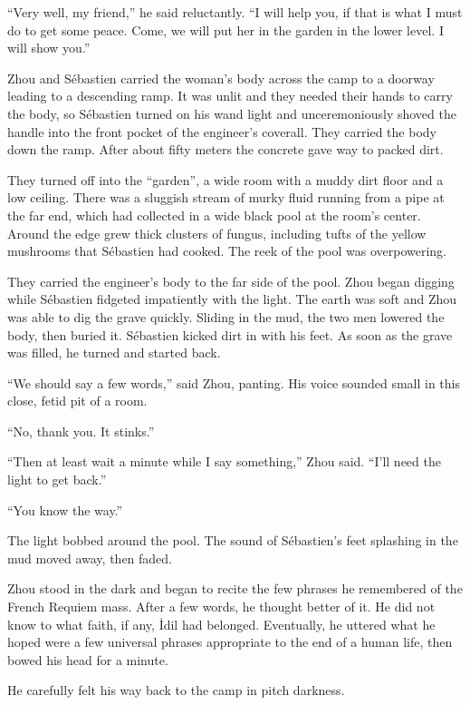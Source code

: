 \documentclass[10pt,a4paper]{article}
\begin{document}
``Very well, my friend,'' he said reluctantly. ``I will help you, if
that is what I must do to get some peace. Come, we will put her in
the garden in the lower level. I will show you.''

\bigskip

Zhou and S\'{e}bastien carried the woman's body across the camp to a
doorway leading to a descending ramp. It was unlit and they needed
their hands to carry the body, so S\'{e}bastien turned on his wand light
and unceremoniously shoved the handle into the front pocket of the
engineer's coverall. They carried the body down the ramp. After
about fifty meters the concrete gave way to packed dirt.

They turned off into the ``garden'', a wide room with a muddy dirt
floor and a low ceiling. There was a sluggish stream of murky fluid
running from a pipe at the far end, which had collected in a wide
black pool at the room's center. Around the edge grew thick clusters
of fungus, including tufts of the yellow mushrooms that S\'{e}bastien
had cooked. The reek of the pool was overpowering.

They carried the engineer's body to the far side of the pool. Zhou
began digging while S\'{e}bastien fidgeted impatiently with the light.
The earth was soft and Zhou was able to dig the grave quickly.
Sliding in the mud, the two men lowered the body, then buried it.
S\'{e}bastien kicked dirt in with his feet. As soon as the grave was
filled, he turned and started back.

``We should say a few words,'' said Zhou, panting. His voice sounded
small in this close, fetid pit of a room.

``No, thank you. It stinks.''

``Then at least wait a minute while I say something,'' Zhou said.
``I'll need the light to get back.''

``You know the way.''

The light bobbed around the pool. The sound of S\'{e}bastien's feet
splashing in the mud moved away, then faded.

Zhou stood in the dark and began to recite the few phrases he
remembered of the French Requiem mass. After a few words, he
thought better of it. He did not know to what faith, if any,
\.{I}dil had belonged. Eventually, he uttered what he hoped were a
few universal phrases appropriate to the end of a human life,
then bowed his head for a minute.

He carefully felt his way back to the camp in pitch darkness.
\end{document}
